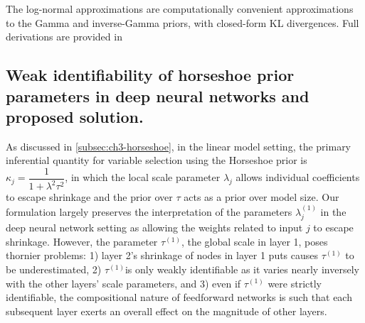 The log-normal approximations are computationally convenient approximations
to the Gamma and inverse-Gamma priors, with closed-form KL divergences.
Full derivations are provided in 



\subsection{Weak identifiability of horseshoe prior parameters in deep neural networks and proposed solution.}
\label{subsec:ch3-taucorrection}

As discussed in \ref{subsec:ch3-horseshoe}, in the linear model setting, the primary inferential quantity for variable selection using the Horseshoe prior is $\kappa_j = \dfrac{1}{1 + \lambda^2\tau^2}$, in which the local scale parameter $\lambda_j$ allows individual coefficients to escape shrinkage and the prior over $\tau$ acts as a prior over model size.  Our formulation largely preserves the interpretation of the parameters $\lambda_j^{(1)}$ in the deep neural network setting as allowing the weights related to input $j$ to escape shrinkage.  However, the parameter $\tau^{(1)}$, the global scale in layer 1, poses thornier problems: 1) layer 2's shrinkage of nodes in layer 1 puts causes $\tau^{(1)}$ to be underestimated, 2) $\tau^{(1)}$is only weakly identifiable as it varies nearly inversely with the other layers' scale parameters, and 3) even if $\tau^{(1)}$ were strictly identifiable, the compositional nature of feedforward networks is such that each subsequent layer exerts an overall effect on the magnitude of other layers.  


